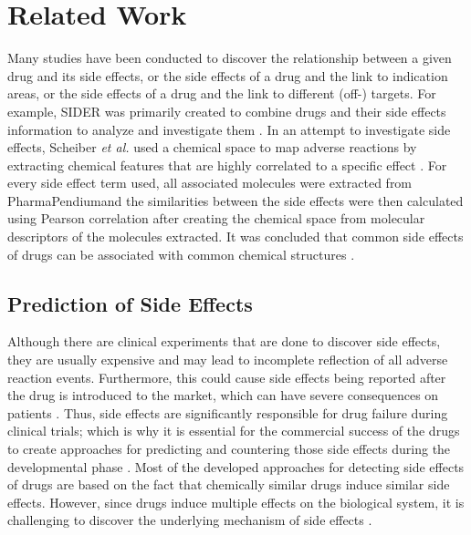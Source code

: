 \section{Related Work}
Many studies have been conducted to discover the relationship between a given drug and its side effects, or the side effects of a drug and the link to indication areas, or the side effects of a drug and the link to different (off-) targets. For example, \ac{SIDER} was primarily created to combine drugs and their side effects information to analyze and investigate them \cite{kuhn_side_2010}.
In an attempt to investigate side effects, Scheiber \textit{et al.} used a chemical space to map adverse reactions by extracting chemical features that are highly correlated to a specific effect \cite{scheiber_mapping_2009}. For every side effect term used, all associated molecules were extracted from PharmaPendium\footnotemark and the similarities between the side effects were then calculated using Pearson correlation after creating the chemical space from molecular descriptors of the molecules extracted. It was concluded that common side effects of drugs can be associated with common chemical structures \cite{scheiber_mapping_2009}. 

\subsection{Prediction of Side Effects}
Although there are clinical experiments that are done to discover side effects, they are usually expensive and may lead to incomplete reflection of all adverse reaction events. Furthermore, this could cause side effects being reported after the drug is introduced to the market, which can have severe consequences on patients \cite{dimitri_drugclust:_2017}. Thus, side effects are significantly responsible for drug failure during clinical trials; which is why it is essential for the commercial success of the drugs to create approaches for predicting and countering those side effects during the developmental phase \cite{mizutani_relating_2012}. Most of the developed approaches for detecting side effects of drugs are based on the fact that chemically similar drugs induce similar side effects. However, since drugs induce multiple effects on the biological system, it is challenging to discover the underlying mechanism of side effects \cite{dimitri_drugclust:_2017}.

